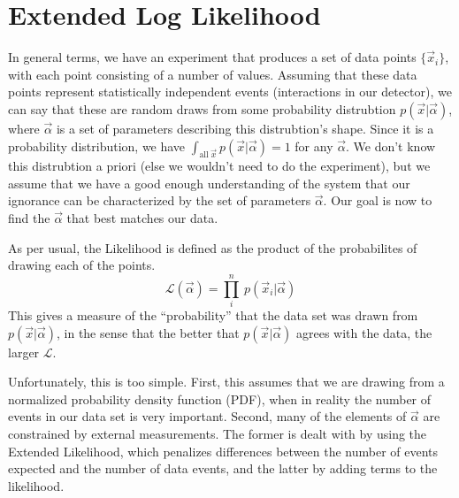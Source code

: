 \section{Extended Log Likelihood}
\label{ExtendedLogLikelihood}
In general terms, we have an experiment that produces a set of data
points $\{\vec{x}_i\}$, with each point consisting of a number of
values.  Assuming that these data points represent
statistically independent events (interactions in our detector), we
can say that these are random draws from some probability distrubtion
$p(\vec{x}|\vec{\alpha})$, where $\vec{\alpha}$ is a set of parameters
describing this distrubtion's shape.  Since it is a probability
distribution, we have $\int_{\mathrm{all}\ \vec{x}}
p(\vec{x}|\vec{\alpha}) = 1$ for any $\vec{\alpha}$.  We don't know
this distrubtion a priori (else we wouldn't need to do the
experiment), but we assume that we have a good enough understanding of
the system that our ignorance can be characterized by the set of
parameters $\vec{\alpha}$.  Our goal is now to find the $\vec{\alpha}$
that best matches our data.

As per usual, the Likelihood is defined as the product of the
probabilites of drawing each of the points.
\begin{equation}
\label{SimpleLikelihood}
\mathcal{L}(\vec{\alpha}) = \prod_i^n\ p(\vec{x}_i|\vec{\alpha})
\end{equation}
This gives a measure of the ``probability'' that the data set was
drawn from $p(\vec{x}|\vec{\alpha})$, in the sense that the better that
$p(\vec{x}|\vec{\alpha})$ agrees with the data, the larger $\mathcal{L}$.

Unfortunately, this is too simple.  First, this assumes that we are
drawing from a normalized probability density function (PDF), when in
reality the number of events in our data set is very important.
Second, many of the elements of $\vec{\alpha}$ are constrained by
external measurements.  The former is dealt with by using the Extended
Likelihood, which penalizes differences between the number of events
expected and the number of data events, and the latter by adding terms
to the likelihood.

